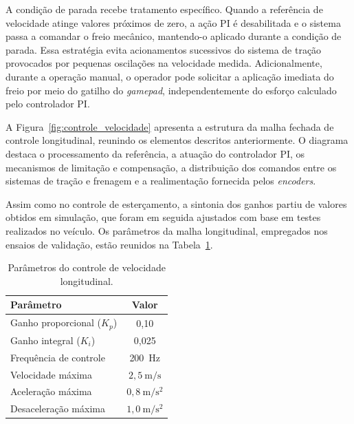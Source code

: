 A condição de parada recebe tratamento específico. Quando a referência de velocidade atinge valores próximos de zero, a ação PI é desabilitada e o sistema passa a comandar o freio mecânico, mantendo-o aplicado durante a condição de parada. Essa estratégia evita acionamentos sucessivos do sistema de tração provocados por pequenas oscilações na velocidade medida. Adicionalmente, durante a operação manual, o operador pode solicitar a aplicação imediata do freio por meio do gatilho do \textit{gamepad}, independentemente do esforço calculado pelo controlador PI.

A Figura~\ref{fig:controle_velocidade} apresenta a estrutura da malha fechada de controle longitudinal, reunindo os elementos descritos anteriormente. O diagrama destaca o processamento da referência, a atuação do controlador PI, os mecanismos de limitação e compensação, a distribuição dos comandos entre os sistemas de tração e frenagem e a realimentação fornecida pelos \textit{encoders}.


Assim como no controle de esterçamento, a sintonia dos ganhos partiu de valores obtidos em simulação, que foram em seguida ajustados com base em testes realizados no veículo. Os parâmetros da malha longitudinal, empregados nos ensaios de validação, estão reunidos na Tabela~\ref{tab:parametros_controle_velocidade}.

\begin{table}[htb]
    \centering
    \caption{Parâmetros do controle de velocidade longitudinal.}
    \label{tab:parametros_controle_velocidade}
    \begin{tabular}{lc}
        \hline
        \textbf{Parâmetro} & \textbf{Valor} \\
        \hline
        Ganho proporcional ($K_p$) & 0,10 \\
        Ganho integral ($K_i$) & 0,025 \\
        Frequência de controle & 200~Hz \\
        Velocidade máxima & $2{,}5~\mathrm{m/s}$ \\
        Aceleração máxima & $0{,}8~\mathrm{m/s^2}$ \\
        Desaceleração máxima & $1{,}0~\mathrm{m/s^2}$ \\
        \hline
    \end{tabular}
\end{table}